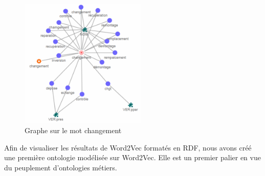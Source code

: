 \begin{figure}[tb]
    \begin{center}
        \includegraphics[width=6cm]{figures/w2v}
    \end{center}
    \caption{Graphe sur le mot changement}\label{fig:w2v}
\end{figure}


Afin de visualiser les résultats de Word2Vec formatés en RDF, nous avons créé une première ontologie modélisée sur Word2Vec. Elle est un premier palier en vue du peuplement d'ontologies métiers.
